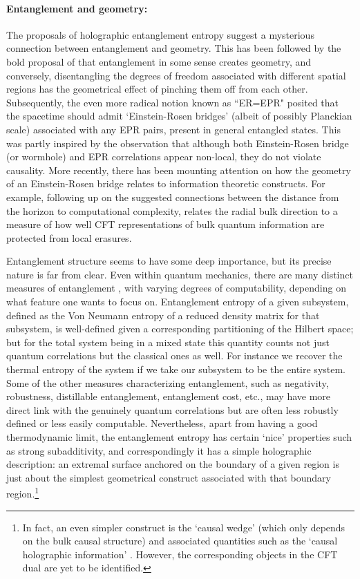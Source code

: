 \documentclass[12pt,a4paper]{article}
\begin{document}
\paragraph{Entanglement and geometry:}  %
The proposals of holographic entanglement entropy \cite{Ryu:2006bv,Hubeny:2007xt} suggest a mysterious connection between entanglement and geometry.  This has been followed by 
the bold proposal of \cite{Swingle:2009bg,VanRaamsdonk:2009ar,VanRaamsdonk:2010pw} that entanglement in some sense creates geometry, and conversely, disentangling the degrees of freedom associated with different spatial regions has the geometrical effect of pinching them off from each other.  Subsequently, the even more radical notion known as ``ER=EPR"  \cite{Maldacena:2013xja} posited that the spacetime should admit `Einstein-Rosen bridges' (albeit of possibly Planckian scale) associated with any EPR pairs, present in general entangled states.  This was partly inspired by the observation that although both Einstein-Rosen bridge (or wormhole) and EPR correlations appear non-local, they do not violate causality. 
More recently, there has been mounting attention on how the geometry of an Einstein-Rosen bridge relates to information theoretic constructs.  For example, following up on the suggested connections \cite{Susskind:2013aaa} between the distance from the horizon to computational complexity, 
 \cite{Almheiri:2014lwa} relates the radial bulk direction to a measure of how well CFT representations of bulk quantum information are protected from local erasures. 

Entanglement structure seems to have some deep importance, but its precise nature is far from clear.  Even within quantum mechanics, there are many distinct measures of entanglement \cite{Vidal:2002zz,Horodecki:2009zz}, with varying degrees of computability, depending on what feature one wants to focus on.
Entanglement entropy of a given subsystem, defined as the Von Neumann entropy of a reduced density matrix for that subsystem, is well-defined given a corresponding partitioning of the Hilbert space; but for the total system being in a mixed state this quantity counts not just quantum correlations but the classical ones as well.  For instance we recover the thermal entropy of the system if we take our subsystem to be the entire system.  
Some of the other measures characterizing entanglement, such as negativity, robustness, distillable entanglement, entanglement cost, etc., may have more direct link with the genuinely quantum correlations but are often less robustly defined or less easily computable.  Nevertheless, apart from having a good thermodynamic limit, the entanglement entropy has certain `nice' properties such as strong subadditivity, and correspondingly it has a simple holographic description: an extremal surface anchored on the boundary of a given region is just about the simplest geometrical construct associated with that boundary region.\footnote{
In fact, an even simpler construct is the `causal wedge' (which only depends on the bulk causal structure) and associated quantities such as the `causal holographic information' \cite{Hubeny:2012wa}.   
However, the corresponding objects in the CFT dual are yet to be identified.
}
\end{document}
